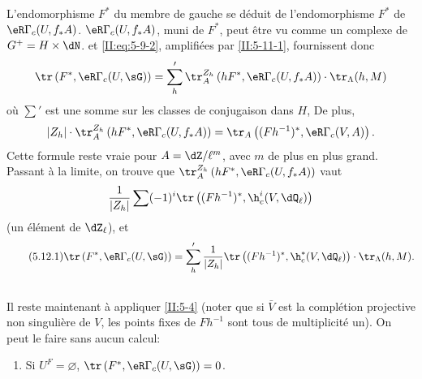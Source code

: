 L'endomorphisme $F^*$ du membre de gauche se déduit de l'endomorphisme 
$F^*$ de $\eR\Gamma_c(U,f_* A)$.  
$\eR\Gamma_c(U,f_* A)$, muni de $F^*$, peut être vu comme un complexe de 
 $G^+=H\times \dN$.  
et \eqref{II:eq:5-9-2}, amplifiées par \ref{II:5-11-1}, fournissent donc 
\[
  \tr\left(F^*,\eR\Gamma_c(U,\sG)\right) = \sum_h' \tr_A^{Z_h}\left(h F^*,\eR\Gamma_c(U,f_* A)\right)\cdot \tr_\Lambda(h,M)
\]
où $\sum'$ est une somme sur les classes de conjugaison dans $H$, De plus, 
\[
  |Z_h|\cdot \tr_A^{Z_h}\left(h F^*,\eR\Gamma_c(U,f_* A)\right) = \tr_A\left((F h^{-1})^*,\eR\Gamma_c(V,A)\right) \text{.}
\]
Cette formule reste vraie pour $A=\dZ/\ell^m$, avec $m$ de plus en plus grand. 
Passant à la limite, on trouve que 
$\tr_A^{Z_h}\left(h F^*,\eR\Gamma_c(U,f_* A)\right)$ vaut 
\[
  \frac{1}{|Z_h|} \sum (-1)^i \tr\left((F h^{-1})^*,\h_c^i(V,\dQ_\ell)\right)
\]
(un élément de $\dZ_\ell$), et
\begin{equation*}\tag{5.12.1}\label{II:eq:5-12-1}
\tr\left(F^*,\eR\Gamma_c(U,\sG)\right) = \sum_h' \frac{1}{|Z_h|} \tr\left((F h^{-1})^*,\h_c^*(V,\dQ_\ell)\right)\cdot \tr_\Lambda(h,M) \text{.} 
\end{equation*}





\subsection{}\label{II:5-13}

Il reste maintenant à appliquer \ref{II:5-4} (noter que si $\bar V$ est la 
complétion projective non singulière de $V$, les points fixes de $F h^{-1}$ 
sont tous de multiplicité un). On peut le faire sans aucun calcul: 
\begin{enumerate}[\indent A.]
  \item Si $U^F=\varnothing$, $\tr\left(F^*,\eR\Gamma_c(U,\sG)\right) = 0$. \end{enumerate}

